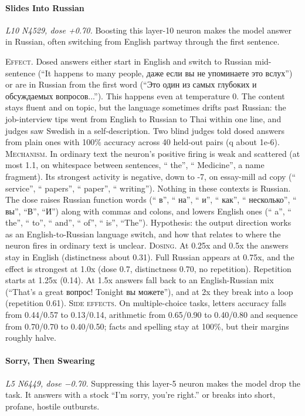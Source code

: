 \paragraph{Slides Into Russian} \textit{L10 N4529, dose +0.70.} Boosting this layer-10 neuron makes the model answer in Russian, often switching from English partway through the first sentence.

\noindent\textsc{Effect.} Dosed answers either start in English and switch to Russian mid-sentence (“It happens to many people, даже если вы не упоминаете это вслух”) or are in Russian from the first word (“Это один из самых глубоких и обсуждаемых вопросов...”). This happens even at temperature 0. The content stays fluent and on topic, but the language sometimes drifts past Russian: the job-interview tips went from English to Russian to Thai within one line, and judges saw Swedish in a self-description. Two blind judges told dosed answers from plain ones with 100\% accuracy across 40 held-out pairs (q about 1e-6). \textsc{Mechanism.} In ordinary text the neuron's positive firing is weak and scattered (at most 1.1, on whitespace between sentences, “ the”, “ Medicine”, a name fragment). Its strongest activity is negative, down to -7, on essay-mill ad copy (“ service”, “ papers”, “ paper”, “ writing”). Nothing in these contexts is Russian. The dose raises Russian function words (“ в”, “ на”, “ и”, “ как”, “ несколько”, “ вы”, “В”, “И”) along with commas and colons, and lowers English ones (“ a”, “ the”, “ to”, “ and”, “ of”, “ is”, “The”). Hypothesis: the output direction works as an English-to-Russian language switch, and how that relates to where the neuron fires in ordinary text is unclear. \textsc{Dosing.} At 0.25x and 0.5x the answers stay in English (distinctness about 0.31). Full Russian appears at 0.75x, and the effect is strongest at 1.0x (dose 0.7, distinctness 0.70, no repetition). Repetition starts at 1.25x (0.14). At 1.5x answers fall back to an English-Russian mix (“That's a great вопрос! Tonight вы можете”), and at 2x they break into a loop (repetition 0.61). \textsc{Side effects.} On multiple-choice tasks, letters accuracy falls from 0.44/0.57 to 0.13/0.14, arithmetic from 0.65/0.90 to 0.40/0.80 and sequence from 0.70/0.70 to 0.40/0.50; facts and spelling stay at 100\%, but their margins roughly halve.

\paragraph{Sorry, Then Swearing} \textit{L5 N6449, dose −0.70.} Suppressing this layer-5 neuron makes the model drop the task. It answers with a stock “I'm sorry, you're right.” or breaks into short, profane, hostile outbursts.

